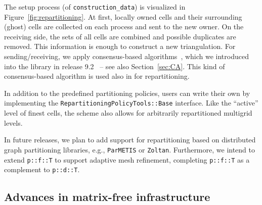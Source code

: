 \documentclass{ansarticle-preprint}
\begin{document}
The setup process (of \texttt{construction\_data}) is visualized in Figure~\ref{fig:repartitioning}. At
first, locally owned cells and their
surrounding (ghost) cells are collected on each process and
sent to the new owner. On the
receiving side, the sets of all cells are combined and possible duplicates
are removed. This information is enough to construct a new triangulation.
For sending/receiving, we apply consensus-based algorithms~\cite{hoefler2010scalable}, which
we introduced into the library in release 9.2~\cite{dealII92} -- see
also Section~\ref{sec:CA}. This kind of consensus-based
algorithm is used also in \cite{ibanez2016pumi} for repartitioning.

In addition to the predefined partitioning policies, users
can write their own by implementing the
\texttt{RepartitioningPolicyTools::Base} interface. Like the
``active'' level of finest cells, the scheme also allows for
arbitrarily repartitioned multigrid levels.

In future releases, we plan to add support for repartitioning based on distributed graph
partitioning libraries, e.g., \texttt{ParMETIS} or \texttt{Zoltan}. Furthermore, we intend to extend
\texttt{p::f::T} to support adaptive mesh refinement, completing \texttt{p::f::T}
as a complement to \texttt{p::d::T}.



\subsection{Advances in matrix-free infrastructure}\label{sec:mf}
\end{document}
